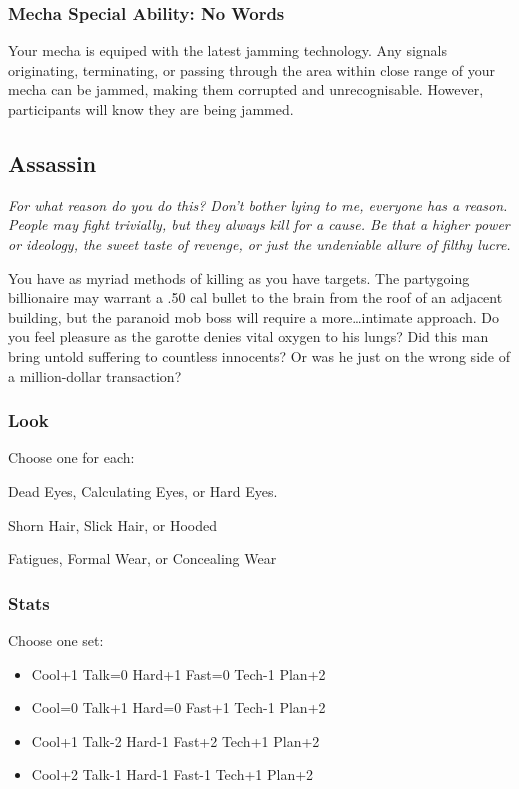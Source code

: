 \subsubsection{Mecha Special Ability: No Words}
Your mecha is equiped with the latest jamming technology. Any signals originating, terminating, or passing through the area within close range of your mecha can be jammed, making them corrupted and unrecognisable. However, participants will know they are being jammed.



\subsection{Assassin}
{\itshape For what reason do you do this? Don't bother lying to me, everyone has a reason. People may fight trivially, but they always kill for a cause. Be that a higher power or ideology, the sweet taste of revenge, or just the undeniable allure of filthy lucre.

You have as myriad methods of killing as you have targets. The partygoing billionaire may warrant a .50 cal bullet to the brain from the roof of an adjacent building, but the paranoid mob boss will require a more\ldots intimate approach. Do you feel pleasure as the garotte denies vital oxygen to his lungs? Did this man bring untold suffering to countless innocents? Or was he just on the wrong side of a million-dollar transaction?}

\subsubsection{Look}
Choose one for each:

Dead Eyes, Calculating Eyes, or Hard Eyes.

Shorn Hair, Slick Hair, or Hooded

Fatigues, Formal Wear, or Concealing Wear

\subsubsection{Stats}
Choose one set:
\begin{itemize}
\setlength\itemsep{0em}
\item Cool+1 Talk=0 Hard+1 Fast=0 Tech-1 Plan+2
\item Cool=0 Talk+1 Hard=0 Fast+1 Tech-1 Plan+2
\item Cool+1 Talk-2 Hard-1 Fast+2 Tech+1 Plan+2
\item Cool+2 Talk-1 Hard-1 Fast-1 Tech+1 Plan+2
\end{itemize}


